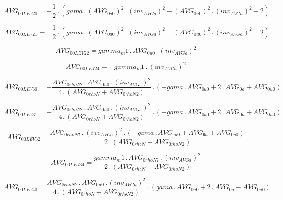 \documentclass{article}
\begin{document}
\begin{dmath}AVG_{0 0 LEV 20} = - \frac{1}{2} \,.\, \left(gama \,.\, \left(AVG_{0 u0} \right)^{2} \,.\, \left(inv_{AVG a} \right)^{2} - \left(AVG_{0 u0} \right)^{2} \,.\, \left(inv_{AVG a} \right)^{2} - 2\right)\end{dmath}

\begin{dmath}AVG_{0 0 LEV 21} = - \frac{1}{2} \,.\, \left(gama \,.\, \left(AVG_{0 u0} \right)^{2} \,.\, \left(inv_{AVG a} \right)^{2} - \left(AVG_{0 u0} \right)^{2} \,.\, \left(inv_{AVG a} \right)^{2} - 2\right)\end{dmath}

\begin{dmath}AVG_{0 0 LEV 22} = gamma_m1 \,.\, AVG_{0 u0} \,.\, \left(inv_{AVG a} \right)^{2}\end{dmath}

\begin{dmath}AVG_{0 0 LEV 24} = - gamma_m1 \,.\, \left(inv_{AVG a} \right)^{2}\end{dmath}

\begin{dmath}AVG_{0 0 LEV 30} = - \frac{AVG_{0 rhoN2} \,.\, AVG_{0 u0} \,.\, \left(inv_{AVG a} \right)^{2}}{4 \,.\, \left(AVG_{0 rhoN} + AVG_{0 rhoN2}\right)} \,.\, \left(- gama \,.\, AVG_{0 u0} + 2 \,.\, AVG_{0 a} + AVG_{0 u0}\right)\end{dmath}

\begin{dmath}AVG_{0 0 LEV 31} = - \frac{AVG_{0 rhoN2} \,.\, AVG_{0 u0} \,.\, \left(inv_{AVG a} \right)^{2}}{4 \,.\, \left(AVG_{0 rhoN} + AVG_{0 rhoN2}\right)} \,.\, \left(- gama \,.\, AVG_{0 u0} + 2 \,.\, AVG_{0 a} + AVG_{0 u0}\right)\end{dmath}

\begin{dmath}AVG_{0 0 LEV 32} = \frac{AVG_{0 rhoN2} \,.\, \left(inv_{AVG a} \right)^{2} \,.\, \left(- gama \,.\, AVG_{0 u0} + AVG_{0 a} + AVG_{0 u0}\right)}{2 \,.\, \left(AVG_{0 rhoN} + AVG_{0 rhoN2}\right)}\end{dmath}

\begin{dmath}AVG_{0 0 LEV 34} = \frac{gamma_m1 \,.\, AVG_{0 rhoN2} \,.\, \left(inv_{AVG a} \right)^{2}}{2 \,.\, \left(AVG_{0 rhoN} + AVG_{0 rhoN2}\right)}\end{dmath}

\begin{dmath}AVG_{0 0 LEV 40} = \frac{AVG_{0 rhoN2} \,.\, AVG_{0 u0} \,.\, \left(inv_{AVG a} \right)^{2}}{4 \,.\, \left(AVG_{0 rhoN} + AVG_{0 rhoN2}\right)} \,.\, \left(gama \,.\, AVG_{0 u0} + 2 \,.\, AVG_{0 a} - AVG_{0 u0}\right)\end{dmath}
\end{document}
